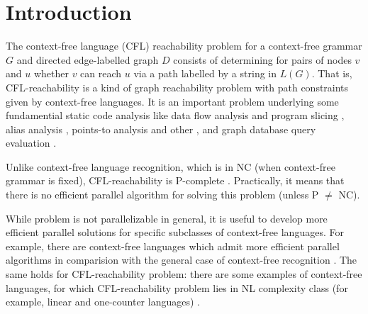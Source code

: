 \documentclass[smallextended]{svjour3}       %
\begin{document}
\section{Introduction}
\label{intro}
The context-free language (CFL) reachability problem for a context-free grammar $G$ and directed edge-labelled graph $D$ consists of determining for pairs of nodes  $v$ and $u$ whether $v$ can reach $u$ via a path labelled by a string in $L(G)$.  That is, CFL-reachability is a kind of graph reachability problem with path constraints given by context-free languages. It is an important problem underlying some fundamential static code analysis like data flow analysis and program slicing \cite{RepsBasic}, alias analysis \cite*{Chatterjee, alias}, points-to analysis \cite{Incremental} and other \cite*{Cai, android, typeflow}, and graph database query evaluation \cite*{Azimov, GrigorevRagozina, HellingsCFPQ, RDF}.


Unlike context-free language recognition, which is in NC (when context-free grammar is fixed), CFL-reachability is P-complete \cite*{ RepSeq, Yannakakis}. Practically, it means that there is no efficient parallel algorithm for solving this problem (unless P $\neq$ NC). 


While problem is not parallelizable in general, it is useful to develop more efficient parallel solutions for specific subclasses of context-free languages. For example, there are context-free languages which admit more efficient parallel algorithms in comparision with the general case of context-free recognition \cite*{IBARRA, IBARRA2, Okhotin2014ComplexityOI}.  The same holds for CFL-reachability problem: there are some examples of context-free languages, for which CFL-reachability problem lies in NL complexity class (for example, linear and one-counter languages) \cite*{LabelledGraphs, LReach, Regularrealizability}. 
\end{document}
